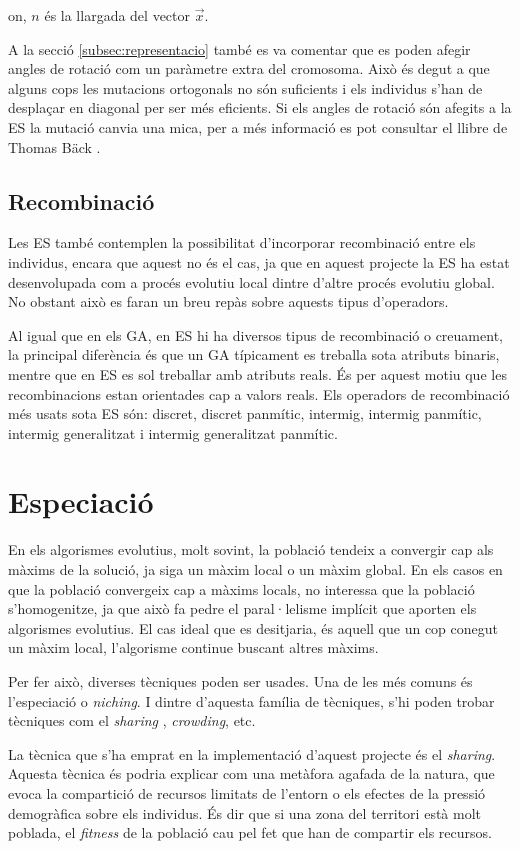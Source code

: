 \documentclass[titlepage,a4paper,12pt]{book}
\begin{document}
on, $n$ és la llargada del vector $\vec{x}$.

A la secció \ref{subsec:representacio} també es va comentar que es poden afegir
angles de rotació com un paràmetre extra del cromosoma. Això és degut a que
alguns cops les mutacions ortogonals no són suficients i els individus s'han de
desplaçar en diagonal per ser més eficients. Si els angles de rotació són
afegits a la ES la mutació canvia una mica, per a més informació es pot
consultar el llibre de Thomas Bäck \cite{37}.

\subsection{Recombinació} Les ES també contemplen la possibilitat d'incorporar
recombinació entre els individus, encara que aquest no és el cas, ja que en
aquest projecte la ES ha estat desenvolupada com a procés evolutiu local dintre
d'altre procés evolutiu global. No obstant això es faran un breu repàs sobre
aquests tipus d'operadors.

Al igual que en els GA, en ES hi ha diversos tipus de recombinació o creuament,
la principal diferència és que un GA típicament es treballa sota atributs
binaris, mentre que en ES es sol treballar amb atributs reals. És per aquest
motiu que les recombinacions estan orientades cap a valors reals. Els operadors
de recombinació més usats sota ES són: discret, discret panmític, intermig,
intermig panmític, intermig generalitzat i intermig generalitzat panmític.

\section{Especiació\label{sec:especiacio}} En els algorismes evolutius, molt
sovint, la població tendeix a convergir cap als màxims de la solució, ja siga un
màxim local o un màxim global. En els casos en que la població convergeix cap a
màxims locals, no interessa que la població s'homogenitze, ja que això fa pedre
el paral·lelisme implícit que aporten els algorismes evolutius. El cas ideal que
es desitjaria, és aquell que un cop conegut un màxim local, l'algorisme continue
buscant altres màxims.

Per fer això, diverses tècniques poden ser usades. Una de les més comuns és
l'especiació o \emph{niching}. I dintre d'aquesta família de tècniques, s'hi
poden trobar tècniques com el \emph{sharing} \cite{33}, \emph{crowding}, etc.

La tècnica que s'ha emprat en la implementació d'aquest projecte és el
\emph{sharing}. Aquesta tècnica és podria explicar com una metàfora agafada de
la natura, que evoca la compartició de recursos limitats de l'entorn o els
efectes de la pressió demogràfica sobre els individus.  És dir que si una zona
del territori està molt poblada, el \emph{fitness} de la població cau pel fet
que han de compartir els recursos.
\end{document}
